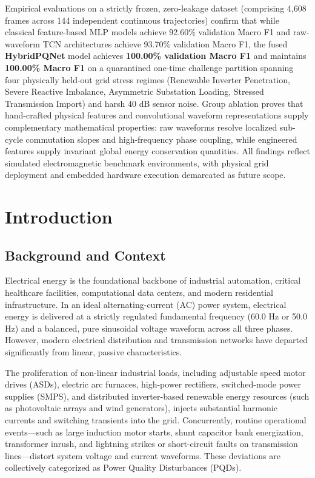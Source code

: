 \documentclass[12pt,a4paper]{report}
\begin{document}
Empirical evaluations on a strictly frozen, zero-leakage dataset (comprising 4,608 frames across 144 independent continuous trajectories) confirm that while classical feature-based MLP models achieve 92.60\% validation Macro F1 and raw-waveform TCN architectures achieve 93.70\% validation Macro F1, the fused \textbf{HybridPQNet} model achieves \textbf{100.00\% validation Macro F1} and maintains \textbf{100.00\% Macro F1} on a quarantined one-time challenge partition spanning four physically held-out grid stress regimes (Renewable Inverter Penetration, Severe Reactive Imbalance, Asymmetric Substation Loading, Stressed Transmission Import) and harsh 40 dB sensor noise. Group ablation proves that hand-crafted physical features and convolutional waveform representations supply complementary mathematical properties: raw waveforms resolve localized sub-cycle commutation slopes and high-frequency phase coupling, while engineered features supply invariant global energy conservation quantities. All findings reflect simulated electromagnetic benchmark environments, with physical grid deployment and embedded hardware execution demarcated as future scope.
\clearpage

\tableofcontents
\clearpage
\listoffigures
\clearpage
\listoftables
\clearpage

\chapter{Introduction}

\section{Background and Context}
Electrical energy is the foundational backbone of industrial automation, critical healthcare facilities, computational data centers, and modern residential infrastructure. In an ideal alternating-current (AC) power system, electrical energy is delivered at a strictly regulated fundamental frequency (60.0 Hz or 50.0 Hz) and a balanced, pure sinusoidal voltage waveform across all three phases. However, modern electrical distribution and transmission networks have departed significantly from linear, passive characteristics.

The proliferation of non-linear industrial loads, including adjustable speed motor drives (ASDs), electric arc furnaces, high-power rectifiers, switched-mode power supplies (SMPS), and distributed inverter-based renewable energy resources (such as photovoltaic arrays and wind generators), injects substantial harmonic currents and switching transients into the grid. Concurrently, routine operational events---such as large induction motor starts, shunt capacitor bank energization, transformer inrush, and lightning strikes or short-circuit faults on transmission lines---distort system voltage and current waveforms. These deviations are collectively categorized as Power Quality Disturbances (PQDs).
\end{document}
